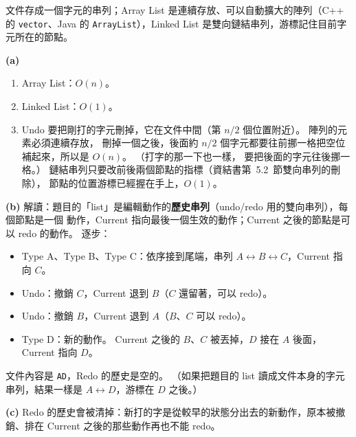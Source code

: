 \begin{pastsoln}
文件存成一個字元的串列；Array List 是連續存放、可以自動擴大的陣列（C++ 的 \texttt{vector}、Java 的
\texttt{ArrayList}），Linked List 是雙向鏈結串列，游標記住目前字元所在的節點。

\textbf{(a)}
\begin{enumerate}
\item Array List：$O(n)$。
\item Linked List：$O(1)$。
\item Undo 要把剛打的字元刪掉，它在文件中間（第 $n/2$ 個位置附近）。 陣列的元素必須連續存放，
刪掉一個之後，後面約 $n/2$ 個字元都要往前挪一格把空位補起來，所以是 $O(n)$。 （打字的那一下也一樣，
要把後面的字元往後挪一格。） 鏈結串列只要改前後兩個節點的指標（資結書第~5.2~節雙向串列的刪除），
節點的位置游標已經握在手上，$O(1)$。
\end{enumerate}

\textbf{(b)} 解讀：題目的「list」是編輯動作的\textbf{歷史串列}（undo/redo 用的雙向串列），每個節點是一個
動作，Current 指向最後一個生效的動作；Current 之後的節點是可以 redo 的動作。 逐步：
\begin{itemize}
\item Type A、Type B、Type C：依序接到尾端，串列 $A \leftrightarrow B \leftrightarrow C$，Current 指向 $C$。
\item Undo：撤銷 $C$，Current 退到 $B$（$C$ 還留著，可以 redo）。
\item Undo：撤銷 $B$，Current 退到 $A$（$B$、$C$ 可以 redo）。
\item Type D：新的動作。 Current 之後的 $B$、$C$ 被丟掉，$D$ 接在 $A$ 後面，Current 指向 $D$。
\end{itemize}
\begin{center}
\end{center}
文件內容是 \texttt{AD}，Redo 的歷史是空的。 （如果把題目的 list 讀成文件本身的字元串列，結果一樣是
$A \leftrightarrow D$，游標在 $D$ 之後。）

\textbf{(c)} Redo 的歷史會被清掉：新打的字是從較早的狀態分出去的新動作，原本被撤銷、排在 Current
之後的那些動作再也不能 redo。


\end{pastsoln}
